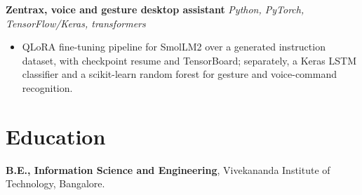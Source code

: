 \documentclass[10pt,a4paper]{article}
\begin{document}
\vspace{1pt}
\textbf{Zentrax, voice and gesture desktop assistant} \textit{Python, PyTorch, TensorFlow/Keras, transformers}
\begin{itemize}
  \item QLoRA fine-tuning pipeline for SmolLM2 over a generated instruction dataset, with checkpoint
        resume and TensorBoard; separately, a Keras LSTM classifier and a scikit-learn random forest
        for gesture and voice-command recognition.
\end{itemize}

\section{Education}
\textbf{B.E., Information Science and Engineering}, Vivekananda Institute of Technology, Bangalore.
\end{document}
